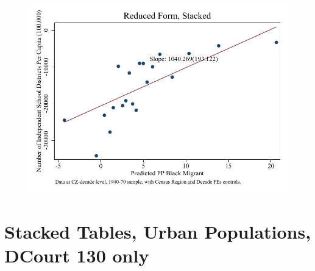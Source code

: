 \documentclass{article}
\begin{document}
\begin{figure}
\centering
\includegraphics{figures/simplefigs/stacked_schdist_ind_pc_C3_urban_rf.pdf}
\end{figure}
\clearpage


\section{Stacked Tables, Urban Populations, DCourt 130 only}
\end{document}
